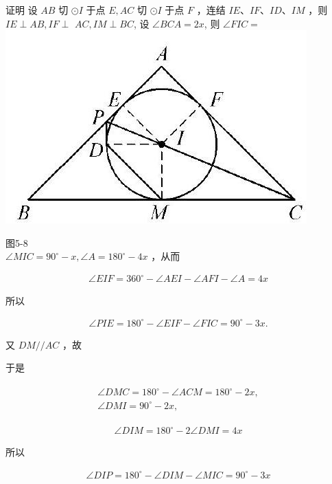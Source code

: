 \documentclass[10pt]{article}
\begin{document}
证明 设 $A B$ 切 $\odot I$ 于点 $E, A C$ 切 $\odot I$ 于点 $F$ ，连结 $I E 、 I F 、 I D 、 I M$ ，则 $I E \perp A B, I F \perp$ $A C, I M \perp B C$, 设 $\angle B C A=2 x$, 则 $\angle F I C=$\\
\includegraphics[max width=\textwidth, center]{2024_10_30_66b8e5e701da2093c133g-035(1)}

图5-8\\
$\angle M I C=90^{\circ}-x, \angle A=180^{\circ}-4 x$ ，从而

\begin{align*}
\angle E I F=360^{\circ}-\angle A E I-\angle A F I-\angle A=4 x
\end{align*}

所以

\begin{align*}
\angle P I E=180^{\circ}-\angle E I F-\angle F I C=90^{\circ}-3 x .
\end{align*}

又 $D M / / A C$ ，故

于是

\begin{align*}
\begin{gathered}
\angle D M C=180^{\circ}-\angle A C M=180^{\circ}-2 x, \\
\angle D M I=90^{\circ}-2 x,
\end{gathered}
\end{align*}

\begin{align*}
\angle D I M=180^{\circ}-2 \angle D M I=4 x
\end{align*}

所以

\begin{align*}
\angle D I P=180^{\circ}-\angle D I M-\angle M I C=90^{\circ}-3 x
\end{align*}
\end{document}
